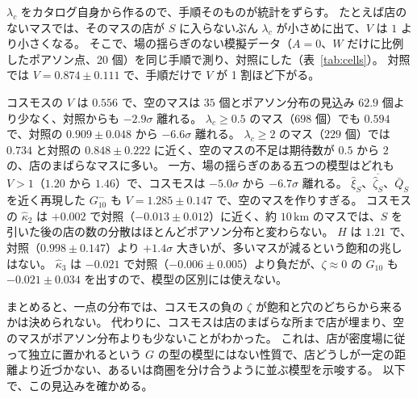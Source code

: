 \documentclass[a4paper,11pt]{ltjsarticle}
\begin{document}
$\lambda_c$ をカタログ自身から作るので、手順そのものが統計をずらす。
たとえば店のないマスでは、そのマスの店が $S$ に入らないぶん $\lambda_c$ が小さめに出て、$V$ は $1$ より小さくなる。
そこで、場の揺らぎのない模擬データ（$A = 0$、$W$ だけに比例したポアソン点、20 個）を同じ手順で測り、対照にした（表~\ref{tab:cells}）。
対照では $V = 0.874 \pm 0.111$ で、手順だけで $V$ が 1 割ほど下がる。

コスモスの $V$ は $0.556$ で、空のマスは $35$ 個とポアソン分布の見込み $62.9$ 個より少なく、対照からも $-2.9\sigma$ 離れる。
$\lambda_c \ge 0.5$ のマス（$698$ 個）でも $0.594$ で、対照の $0.909 \pm 0.048$ から $-6.6\sigma$ 離れる。
$\lambda_c \ge 2$ のマス（$229$ 個）では $0.734$ と対照の $0.848 \pm 0.222$ に近く、空のマスの不足は期待数が $0.5$ から $2$ の、店のまばらなマスに多い。
一方、場の揺らぎのある五つの模型はどれも $V > 1$（$1.20$ から $1.46$）で、コスモスは $-5.0\sigma$ から $-6.7\sigma$ 離れる。
$\hat\xi_S$、$\overline{\hat\zeta_S}$、$\bar Q_S$ を近く再現した $G_{10}^{-}$ も $V = 1.285 \pm 0.147$ で、空のマスを作りすぎる。
コスモスの $\hat\kappa_2$ は $+0.002$ で対照（$-0.013 \pm 0.012$）に近く、約 $10\,\mathrm{km}$ のマスでは、$S$ を引いた後の店の数の分散はほとんどポアソン分布と変わらない。
$H$ は $1.21$ で、対照（$0.998 \pm 0.147$）より $+1.4\sigma$ 大きいが、多いマスが減るという飽和の兆しはない。
$\hat\kappa_3$ は $-0.021$ で対照（$-0.006 \pm 0.005$）より負だが、$\zeta \approx 0$ の $G_{10}$ も $-0.021 \pm 0.034$ を出すので、模型の区別には使えない。

まとめると、一点の分布では、コスモスの負の $\zeta$ が飽和と穴のどちらから来るかは決められない。
代わりに、コスモスは店のまばらな所まで店が埋まり、空のマスがポアソン分布よりも少ないことがわかった。
これは、店が密度場に従って独立に置かれるという $G$ の型の模型にはない性質で、店どうしが一定の距離より近づかない、あるいは商圏を分け合うように並ぶ模型を示唆する。
以下で、この見込みを確かめる。

\begin{table}[t]
  \centering
  \caption{約 $10\,\mathrm{km}$ のマス（2 次メッシュ）ごとの店の数の統計（$\lambda_c \ge 1$ のマス、式~\eqref{eq:cell-kappa} と本文の $V$、$H$）。
    模擬データは各 20 個（$R_W = 25\,\mathrm{km}$）。$A = 0$ は場の揺らぎのない対照で、ほかは表~\ref{tab:vary-r-mocks-skew} と同じ店の位置（$G_{10}^{-}I_1$ は \ref{sec:inhibition} 節、$hI_1$ は \ref{sec:catchment} 節）。$hI_1'$ は $hI_1$ を別の乱数の種で作り直したもの。
    模擬データは平均 $\pm$ 標準偏差で、括弧の中は（コスモス $-$ 平均）/ 標準偏差。}
  \label{tab:cells}
  \footnotesize
  \setlength{\tabcolsep}{3pt}
  
\end{table}
\end{document}
